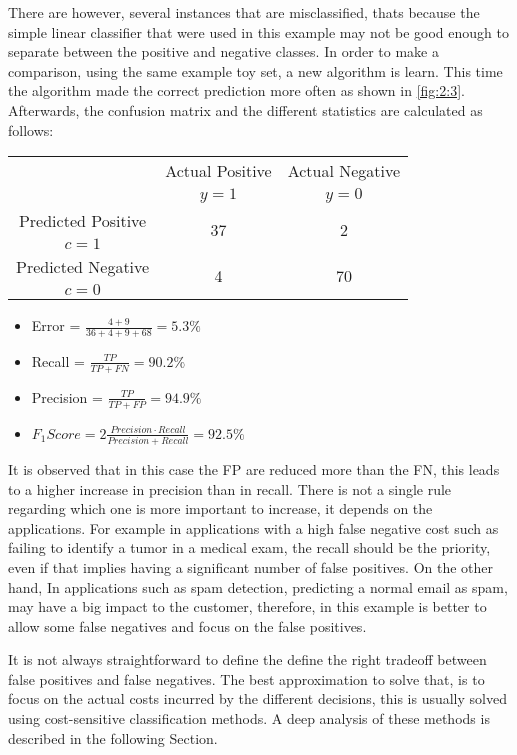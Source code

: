 There are however, several instances that are misclassified, thats because the simple linear 
classifier that were used in this example may not be good enough to separate between the positive 
and negative classes. In order to make a comparison, using the same example toy set, a new 
algorithm is learn. This time the algorithm made the correct prediction more often as shown in 
\figurename{ \ref{fig:2:3}}. Afterwards, the confusion matrix and the different statistics are 
calculated as follows:
\begin{center}
		\footnotesize
    \begin{tabular}{c|c|c}
			\multicolumn{1}{c|}{}  & Actual Positive& Actual Negative \\
			\multicolumn{1}{c|}{} & $y=1$& $y=0$ \\
			\hline
			Predicted Positive 		& \multirow{ 2}{*}{37} & \multirow{ 
			2}{*}{2} \\
			$c=1$ & &\\
			\hline
			Predicted Negative  	& \multirow{ 2}{*}{4} & \multirow{ 
			2}{*}{70} \\
			$c=0$ & &\\
		\end{tabular}
\end{center}
  \begin{itemize}
    \item Error = $\frac{4+9}{36+4+9+68}=5.3\%$
    \item Recall = $\frac{TP}{TP+FN}=90.2\%$
    \item Precision = $\frac{TP}{TP+FP}=94.9\%$
    \item $F_1Score = 2\frac{Precision \cdot Recall}{Precision + Recall}=92.5\%$
  \end{itemize}
It is observed that in this case the FP are reduced more than the FN, this leads to a higher 
increase in precision  than in recall. There is not a single rule regarding which one is more 
important to increase, it depends on the applications. For example in applications with a high 
false negative cost such as failing to identify a tumor in a medical exam, the recall should be the 
priority, even if that implies having a significant number of false positives. On the other hand, 
In applications such as spam detection, predicting a normal email as spam, may have a big impact to 
the customer, therefore, in this example is better to allow some false negatives and focus on the 
false positives.

It is not always straightforward  to define the define the right tradeoff between false positives 
and false negatives. The best approximation to solve that, is to focus on the actual costs incurred 
by the different decisions, this is usually solved using cost-sensitive classification methods. A 
deep analysis of these methods is described in the following Section.

